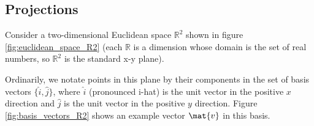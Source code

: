 \subsection{Projections}

Consider a two-dimensional Euclidean space $\mathbb{R}^2$ shown in figure
\ref{fig:euclidean_space_R2} (each $\mathbb{R}$ is a dimension whose domain is
the set of real numbers, so $\mathbb{R}^2$ is the standard x-y plane).
\begin{bookfigure}

  \caption{Euclidean space $\mathbb{R}^2$}
  \label{fig:euclidean_space_R2}
\end{bookfigure}

Ordinarily, we notate points in this plane by their components in the set of
basis vectors $\{\hat{i}, \hat{j}\}$, where $\hat{i}$ (pronounced i-hat) is the
unit vector in the positive $x$ direction and $\hat{j}$ is the unit vector in
the positive $y$ direction. Figure \ref{fig:basis_vectors_R2} shows an example
vector $\mat{v}$ in this basis.
\begin{bookfigure}

  \caption{$\mat{v}$ with basis set $\{\hat{i}, \hat{j}\}$}
  \label{fig:basis_vectors_R2}
\end{bookfigure}

